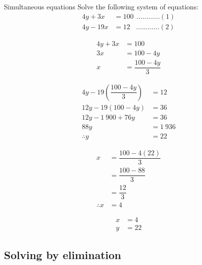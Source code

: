 \begin{wex}
{Simultaneous equations}
{Solve the following system of equations:
\begin{align*}
  4y+3x &= 100  ~~\ldots \ldots \ldots \ldots (1) \\
  4y - 19x &= 12 ~~~~\ldots \ldots \ldots \ldots (2)
\end{align*}
}
{
\begin{align*}
  4y+3x &= 100 \\
  3x &= 100 - 4y \\
  x &= \dfrac{100 - 4y}{3}
\end{align*}

\begin{align*}
  4y - 19\left(\dfrac{100 - 4y}{3}\right) &= 12 \\
  12y - 19(100 - 4y) &= 36 \\
  12y - 1~900 + 76y &= 36 \\
  88y &= 1~936 \\
  \therefore y &= 22
\end{align*}

\begin{align*}
  x &= \dfrac{100 - 4(22)}{3} \\
    &= \dfrac{100-88}{3} \\
    &= \dfrac{12}{3} \\
  \therefore x &= 4
\end{align*}


\begin{align*}
  x &= 4 \\
  y &= 22
\end{align*}
}
\end{wex}

\subsection*{Solving by elimination}

